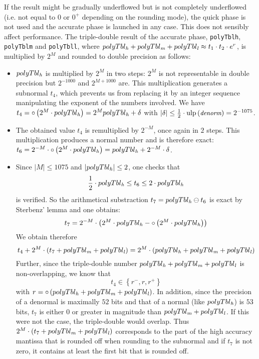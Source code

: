 If the result might be gradually underflowed but is not completely
underflowed (i.e. not equal to $0$ or $0^+$ depending on the rounding
mode), the quick phase is not used and the accurate phase is launched
in any case. This does not sensibly affect performance. The
triple-double result of the accurate phase, \texttt{polyTblh},
\texttt{polyTblm} and \texttt{polyTbll}, where $polyTbl_{\mathit{h}} +
polyTbl_{\mathit{m}} + polyTbl_{\mathit{l}} \approx t_1 \cdot t_2 \cdot e^r$, is
multiplied by $2^M$ and rounded to double precision as follows:
\begin{itemize}
\item $polyTbl_{\mathit{h}}$ is multiplied by $2^M$ in two steps: $2^M$ is not
representable in double precision but $2^{-1000}$ and $2^{M+1000}$
are. This multiplication generates a subnormal $t_4$, which prevents
us from replacing it by an integer sequence manipulating the exponent
of the numbers involved. We have $t_4 = \circ \left( 2^M \cdot
polyTbl_{\mathit{h}}\right) = 2^M polyTbl_{\mathit{h}} + \delta$ with $\left \vert
\delta \right \vert \leq \frac{1}{2} \cdot \mathrm{ulp}\left( \mbox{\small \it denorm} \right)
= 2^{-1075}$.
\item The obtained value $t_4$ is remultiplied by $2^{-M}$, once again
in $2$ steps. This multiplication produces a normal number and is
therefore exact: $t_6 = 2^{-M} \cdot \circ\left( 2^M \cdot
polyTbl_{\mathit{h}} \right) = polyTbl_{\mathit{h}} + 2^{-M} \cdot \delta$.
\item Since $\left \vert M \right \vert \leq 1075$ and $\left \vert
polyTbl_{\mathit{h}} \right \vert \leq 2$, one checks that 
$$\frac{1}{2} \cdot polyTbl_{\mathit{h}} \leq t_6 \leq 2 \cdot polyTbl_{\mathit{h}}$$
is verified. So the arithmetical substraction $t_7 = polyTbl_{\mathit{h}} \ominus t_6$ 
is exact by Sterbenz' lemma and one obtains: 
$$t_7 = 2^{-M} \cdot \left( 2^M \cdot polyTbl_{\mathit{h}} - \circ \left( 2^M
\cdot polyTbl_{\mathit{h}} \right) \right)$$
We obtain therefore
$$t_4 + 2^M \cdot \left( t_7 + polyTbl_{\mathit{m}} + polyTbl_{\mathit{l}} \right) = 
2^M \cdot \left( polyTbl_{\mathit{h}} + polyTbl_{\mathit{m}} + polyTbl_{\mathit{l}} \right)$$
Further, since the triple-double number
$polyTbl_{\mathit{h}} + polyTbl_{\mathit{m}} + polyTbl_{\mathit{l}}$ is non-overlapping, we know that
$$t_4 \in \left \lbrace r^-, r, r^+\right \rbrace$$
with $r = \circ \left( polyTbl_{\mathit{h}} + polyTbl_{\mathit{m}} + polyTbl_{\mathit{l}} \right)$.
In addition, since the precision of a denormal is maximally $52$ bits and 
that of a normal (like $polyTbl_{\mathit{h}}$) is $53$ bits, $t_7$ is either $0$ or 
greater in magnitude than $polyTbl_{\mathit{m}} + polyTbl_{\mathit{l}}$. If this were not the case, 
the triple-double would overlap. Thus $2^M \cdot \left( t_7 + polyTbl_{\mathit{m}} + polyTbl_{\mathit{l}} \right)$
corresponds to the part of the high accuracy mantissa that is rounded off when 
rounding to the subnormal and if $t_7$ is not zero, it contains at least the first bit that is rounded off.
\end{itemize}
